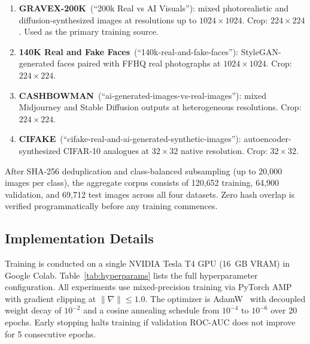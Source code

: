 \documentclass[conference]{IEEEtran}
\begin{document}
\begin{enumerate}[leftmargin=*,nosep]
\item \textbf{GRAVEX-200K}~(``200k Real vs AI Visuals''): mixed photorealistic and diffusion-synthesized images at resolutions up to $1024{\times}1024$. Crop: $224{\times}224$. Used as the primary training source.
\item \textbf{140K Real and Fake Faces}~(``140k-real-and-fake-faces''): StyleGAN-generated faces paired with FFHQ real photographs at $1024{\times}1024$. Crop: $224{\times}224$.
\item \textbf{CASHBOWMAN}~(``ai-generated-images-vs-real-images''): mixed Midjourney and Stable Diffusion outputs at heterogeneous resolutions. Crop: $224{\times}224$.
\item \textbf{CIFAKE}~(``cifake-real-and-ai-generated-synthetic-images''): autoencoder-synthesized CIFAR-10 analogues at $32{\times}32$ native resolution. Crop: $32{\times}32$.
\end{enumerate}

After SHA-256 deduplication and class-balanced subsampling (up to 20{,}000 images per class), the aggregate corpus consists of 120{,}652 training, 64{,}900 validation, and 69{,}712 test images across all four datasets. Zero hash overlap is verified programmatically before any training commences.

\subsection{Implementation Details}

Training is conducted on a single NVIDIA Tesla T4 GPU (16~GB VRAM) in Google Colab. Table~\ref{tab:hyperparams} lists the full hyperparameter configuration. All experiments use mixed-precision training via PyTorch AMP with gradient clipping at $\|\nabla\| \leq 1.0$. The optimizer is AdamW~\cite{loshchilov2019adamw} with decoupled weight decay of $10^{-2}$ and a cosine annealing schedule from $10^{-4}$ to $10^{-6}$ over 20 epochs. Early stopping halts training if validation ROC-AUC does not improve for 5 consecutive epochs.
\end{document}
